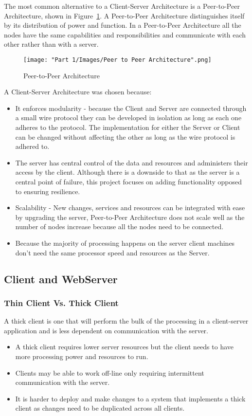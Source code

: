 	The most common alternative to a Client-Server Architecture is a Peer-to-Peer Architecture, shown in Figure~\ref{fig:peertoPeer}. A Peer-to-Peer Architecture distinguishes itself by its distribution of power and function. In a Peer-to-Peer Architecture all the nodes have the same capabilities and responsibilities and communicate with each other rather than with a server.\\
	
		\begin{figure}[H]
			\centering
			\texttt{[image: "Part 1/Images/Peer to Peer Architecture".png]}
			\caption{Peer-to-Peer Architecture}
    			\label{fig:peertoPeer}
		\end{figure}	
		
	A Client-Server Architecture was chosen because:
	
		\begin{itemize}
			\item It enforces modularity - because the Client and Server are connected through a small wire protocol they can be developed in isolation as long as each one adheres to the protocol. The implementation for either the Server or Client can be changed without affecting the other as long as the wire protocol is adhered to.
			\item The server has central control of the data and resources and administers their access by the client. Although there is a downside to that as the server is a central point of failure, this project focuses on adding functionality opposed to ensuring resilience.
			\item Scalability - New changes, services and resources can be integrated with ease by upgrading the server, Peer-to-Peer Architecture does not scale well as the number of nodes increase because all the nodes need to be connected. 
			\item Because the majority of processing happens on the server client machines don't need the same processor speed and resources as the Server. 
		\end{itemize}

\subsection{Client and WebServer}
	\subsubsection{Thin Client Vs. Thick Client}
		A thick client is one that will perform the bulk of the processing in a client-server application and is less dependent on communication with the server. 
		\begin{itemize}
			\item A thick client requires lower server resources but the client needs to have more processing power and resources to run.
			\item Clients may be able to work off-line only requiring intermittent communication with the server.
			\item It is harder to deploy and make changes to a system that implements a thick client as changes need to be duplicated across all clients.
		\end{itemize}				

